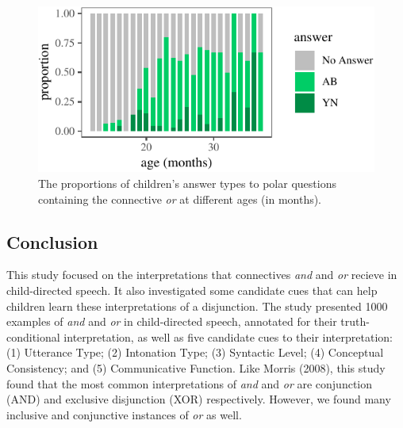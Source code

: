 \documentclass[,man,floatsintext]{apa6}
\begin{document}
\begin{figure}[tb]

{\centering \includegraphics{figs/answerPlot-1} 

}

\caption{The proportions of children's answer types to polar questions containing the connective \textit{or} at different ages (in months).}\label{fig:answerPlot}
\end{figure}

\hypertarget{conclusion}{%
\subsection{Conclusion}\label{conclusion}}

This study focused on the interpretations that connectives \emph{and} and \emph{or} recieve in child-directed speech. It also investigated some candidate cues that can help children learn these interpretations of a disjunction. The study presented 1000 examples of \emph{and} and \emph{or} in child-directed speech, annotated for their truth-conditional interpretation, as well as five candidate cues to their interpretation: (1) Utterance Type; (2) Intonation Type; (3) Syntactic Level; (4) Conceptual Consistency; and (5) Communicative Function. Like Morris (2008), this study found that the most common interpretations of \emph{and} and \emph{or} are conjunction (AND) and exclusive disjunction (XOR) respectively. However, we found many inclusive and conjunctive instances of \emph{or} as well.
\end{document}
